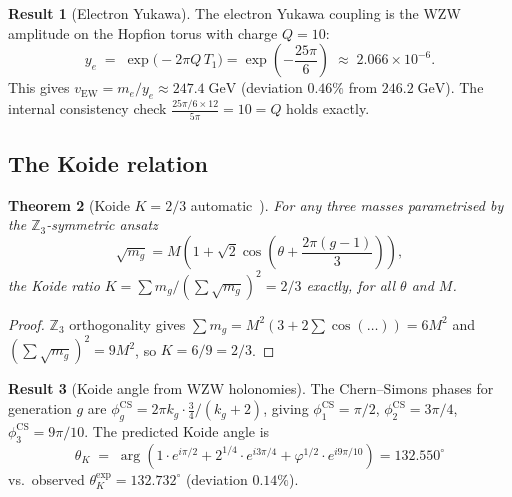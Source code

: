 \documentclass[11pt,a4paper]{article}
\newtheorem{theorem}{Theorem}[section]
\theoremstyle{definition}
\newtheorem{result}[theorem]{Result}
\theoremstyle{remark}
\newcommand{\vp}{\varphi}
\begin{document}
\begin{result}[Electron Yukawa]
\label{P1:res:yukawa}
The electron Yukawa coupling is the WZW amplitude on the Hopfion torus
with charge $Q=10$:
\begin{equation}
  \boxed{y_e \;=\; \exp\!\bigl(-2\pi Q\,T_1\bigr)
  = \exp\!\left(-\frac{25\pi}{6}\right) \;\approx\; 2.066\times10^{-6}.}
  \label{P1:eq:yukawa}
\end{equation}
This gives $v_{\mathrm{EW}} = m_e/y_e \approx 247.4\;\text{GeV}$
(deviation $0.46\%$ from $246.2\;\text{GeV}$).  The internal consistency
check $\tfrac{25\pi/6\times 12}{5\pi} = 10 = Q$ holds exactly.
\end{result}
 
\subsection{The Koide relation}
 
\begin{theorem}[Koide $K=2/3$ automatic~\cite{Koide1983}]
\label{P1:thm:koide}
For any three masses parametrised by the $\mathbb{Z}_3$-symmetric ansatz
\begin{equation}
  \sqrt{m_g} = M\!\left(1 + \sqrt{2}\cos\!\left(\theta+\frac{2\pi(g-1)}{3}\right)\right),
  \label{P1:eq:koide_ansatz}
\end{equation}
the Koide ratio $K = \sum m_g/(\sum\sqrt{m_g})^2 = 2/3$ exactly,
for all $\theta$ and $M$.
\end{theorem}
 
\begin{proof}
$\mathbb{Z}_3$ orthogonality gives $\sum m_g = M^2(3 + 2\sum\cos(\ldots)) = 6M^2$
and $(\sum\sqrt{m_g})^2 = 9M^2$, so $K=6/9=2/3$.
\end{proof}



\begin{result}[Koide angle from WZW holonomies]
\label{P1:res:koide_angle}
The Chern--Simons phases for generation $g$ are
$\phi_g^{\mathrm{CS}} = 2\pi k_g\cdot\tfrac{3}{4}/(k_g+2)$,
giving $\phi_1^{\mathrm{CS}} = \pi/2$, $\phi_2^{\mathrm{CS}} = 3\pi/4$,
$\phi_3^{\mathrm{CS}} = 9\pi/10$.
The predicted Koide angle is
\begin{equation}
  \theta_K \;=\;
  \arg\!\left(
    1\cdot e^{i\pi/2}
    + 2^{1/4}\cdot e^{i3\pi/4}
    + \vp^{1/2}\cdot e^{i9\pi/10}
  \right) = 132.550^{\circ}
  \label{P1:eq:thetaK}
\end{equation}
vs.\ observed $\theta_K^{\mathrm{exp}} = 132.732^{\circ}$ (deviation $0.14\%$).
\end{result}
 
\end{document}
